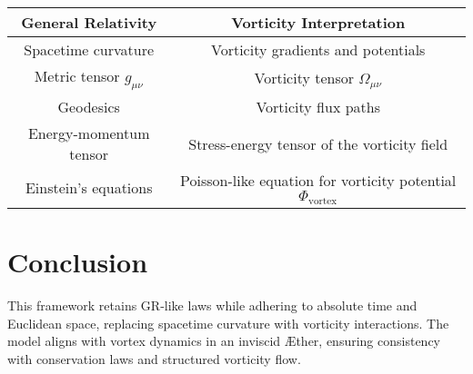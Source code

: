     \begin{center}
        \begin{tabular}{|c|c|}
            \hline
            \textbf{General Relativity} & \textbf{Vorticity Interpretation} \\
            \hline
            Spacetime curvature & Vorticity gradients and potentials \\
            Metric tensor $g_{\mu\nu}$ & Vorticity tensor $\Omega_{\mu\nu}$ \\
            Geodesics & Vorticity flux paths \\
            Energy-momentum tensor & Stress-energy tensor of the vorticity field \\
            Einstein's equations & Poisson-like equation for vorticity potential $\Phi_{\text{vortex}}$ \\
            \hline
        \end{tabular}
    \end{center}

    \section{Conclusion}
    This framework retains GR-like laws while adhering to absolute time and Euclidean space, replacing spacetime curvature with vorticity interactions. The model aligns with vortex dynamics in an inviscid Æther, ensuring consistency with conservation laws and structured vorticity flow.
